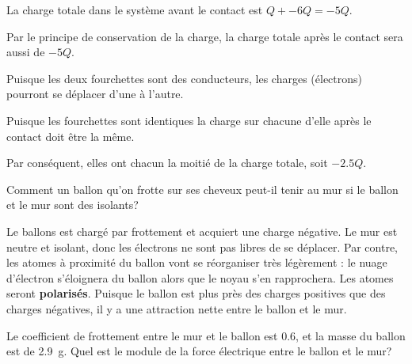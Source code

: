 \begin{reponsebox}
  La charge totale dans le système avant le contact est $Q + -6Q = -5Q$.

  Par le principe de conservation de la charge, la charge totale après le
  contact sera aussi de $-5Q$.

  Puisque les deux fourchettes sont des conducteurs, les charges (électrons)
  pourront se déplacer d'une à l'autre.

  Puisque les fourchettes sont identiques la charge sur chacune d'elle après le
  contact doit être la même.

  Par conséquent, elles ont chacun la moitié de la charge totale, soit
  $-\num{2.5}Q$.
\end{reponsebox}



Comment un ballon qu'on frotte sur ses cheveux peut-il tenir au mur si le
ballon et le mur sont des isolants?

Le ballons est chargé par frottement et acquiert une charge négative. Le mur
est neutre et isolant, donc les électrons ne sont pas libres de se déplacer.
Par contre, les atomes à proximité du ballon vont se réorganiser très
légèrement : le nuage d'électron s'éloignera du ballon alors que le noyau
s'en rapprochera. Les atomes seront \textbf{polarisés}. Puisque le ballon est
plus près des charges positives que des charges négatives, il y a une
attraction nette entre le ballon et le mur.

\begin{diapobox}
  Le coefficient de frottement entre le mur et le ballon est $\num{0.6}$, et la
  masse du ballon est de \SI{2.9}{g}. Quel est le module de la force électrique
  entre le ballon et le mur?
  \begin{center}
  \end{center}
\end{diapobox}

